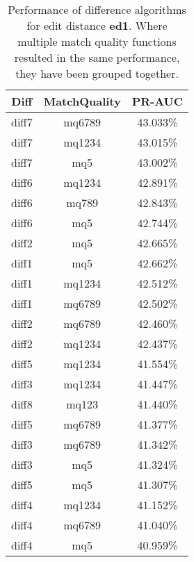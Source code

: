 \begin{table}[tbph]
\begin{center}
\begin{tabular}{|c|c||c|}
\hline
Diff & MatchQuality & PR-AUC  \\
\hline
\hline
diff7 & mq6789 & 43.033\% \\
diff7 & mq1234 & 43.015\% \\
diff7 & mq5 & 43.002\% \\
diff6 & mq1234 & 42.891\% \\
diff6 & mq789 & 42.843\% \\
diff6 & mq5 & 42.744\% \\
diff2 & mq5 & 42.665\% \\
diff1 & mq5 & 42.662\% \\
diff1 & mq1234 & 42.512\% \\
diff1 & mq6789 & 42.502\% \\
diff2 & mq6789 & 42.460\% \\
diff2 & mq1234 & 42.437\% \\
diff5 & mq1234 & 41.554\% \\
diff3 & mq1234 & 41.447\% \\
diff8 & mq123 & 41.440\% \\
diff5 & mq6789 & 41.377\% \\
diff3 & mq6789 & 41.342\% \\
diff3 & mq5 & 41.324\% \\
diff5 & mq5 & 41.307\% \\
diff4 & mq1234 & 41.152\% \\
diff4 & mq6789 & 41.040\% \\
diff4 & mq5 & 40.959\% \\
\hline
\end{tabular}
\end{center}
\caption{Performance of difference algorithms for
  edit distance \textbf{ed1}.  Where multiple match
  quality functions resulted in the same performance, they
  have been grouped together.}
\label{tab:editlongbyed1}
\end{table}
